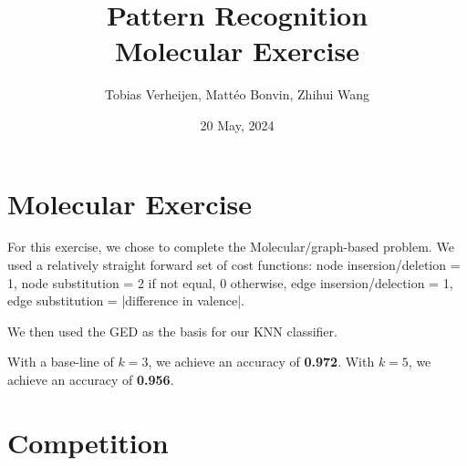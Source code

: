 \documentclass{article}
\title{Pattern Recognition \\\Large{Molecular Exercise}}
\author{Tobias Verheijen, Mattéo Bonvin, Zhihui Wang}
\date{20 May, 2024}
\begin{document}
\maketitle

\section{Molecular Exercise}

For this exercise, we chose to complete the Molecular/graph-based problem. 
We used a relatively straight forward set of cost functions: node insersion/deletion = 1, node substitution = 2 if not equal, 0 otherwise, edge insersion/delection = 1, edge substitution = |difference in valence|.

We then used the GED as the basis for our KNN classifier.

With a base-line of $k=3$, we achieve an accuracy of \textbf{0.972}. With $k=5$, we achieve an accuracy of \textbf{0.956}.

\section{Competition}
\end{document}
